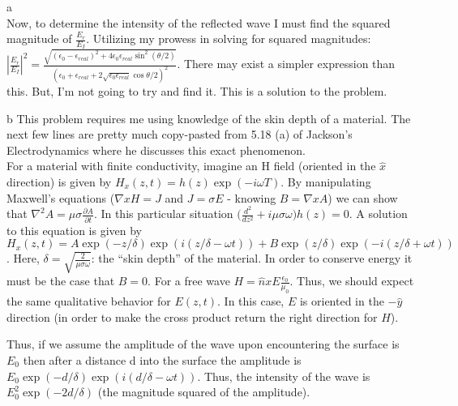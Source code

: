 \begin{homeworkProblem}
\begin{homeworkSection}{a}
\\
Now, to determine the intensity of the reflected wave I must find the squared magnitude of $\frac{E_r}{E_I}$. Utilizing my prowess in solving for squared magnitudes: $|\frac{E_r}{E_I}|^2 = \frac{\sqrt{(\epsilon_0-\epsilon_{real})^2+4\epsilon_0\epsilon_{real}\sin^2(\theta/2)}}{(\epsilon_0+\epsilon_{real}+2\sqrt{\epsilon_0 \epsilon_{real}}\cos\theta/2)^2}$. There may exist a simpler expression than this. But, I'm not going to try and find it. This is a solution to the problem.

\end{homeworkSection}

\begin{homeworkSection}{b}
This problem requires me using knowledge of the skin depth of a material. The next few lines are pretty much copy-pasted from 5.18 (a) of Jackson's Electrodynamics where he discusses this exact phenomenon.
\\

For a material with finite conductivity, imagine an H field (oriented in the $\hat{x}$ direction) is given by $H_x(z,t) = h(z)\exp(-i\omega T)$. By manipulating Maxwell's equations ($\nabla x H = J$ and $J = \sigma E$ - knowing $B = \nabla x A$) we can show that $\nabla^2A = \mu\sigma \frac{\partial{A}}{\partial{t}}$. In this particular situation $\big( \frac{d^2}{dz^2} + i\mu\sigma\omega \big) h(z) = 0$. A solution to this equation is given by $H_x(z,t) = A\exp(-z/\delta)\exp(i(z/\delta - \omega t)) + B\exp(z/\delta)\exp(-i(z/\delta + \omega t))$. Here, $\delta = \sqrt{\frac{2}{\mu\sigma\omega}}$: the ``skin depth'' of the material. In order to conserve energy it must be the case that $B = 0$. For a free wave $H = \hat{n} x E \frac{\epsilon_0}{\mu_0}$. Thus, we should expect the same qualitative behavior for $E(z,t)$. In this case, $E$ is oriented in the $-\hat{y}$ direction (in order to make the cross product return the right direction for $H$).

Thus, if we assume the amplitude of the wave upon encountering the surface is $E_0$ then after a distance d into the surface the amplitude is $E_0 \exp(-d/\delta)\exp(i(d/\delta -\omega t))$. Thus, the intensity of the wave is $E_0^2 \exp(-2d/\delta)$ (the magnitude squared of the amplitude).

\end{homeworkSection}
\end{homeworkProblem}

